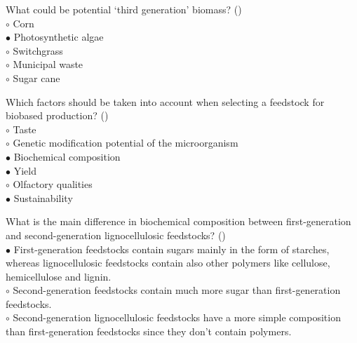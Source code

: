 \documentclass[]{beamer}
\begin{document}
\begin{CJK}{UTF8}{gbsn}
\begin{frame}[shrink] {} 
\addtocounter{answers}{1}
\color{blue}
  What could be potential ‘third generation’ biomass?
 ({})\\
\color{black}
\setlength{\parindent}{-0.4cm}
{\color{red}$\circ$} Corn  \\
{\color{red}$\bullet$} Photosynthetic algae  \\
{\color{red}$\circ$} Switchgrass  \\
{\color{red}$\circ$} Municipal waste  \\
{\color{red}$\circ$} Sugar cane  \\
\end{frame}


\begin{frame}[shrink] {} 
\addtocounter{answers}{1}
\color{blue}
  Which factors should be taken into account when selecting a feedstock for biobased production?
 ({})\\
\color{black}
\setlength{\parindent}{-0.4cm}
{\color{red}$\circ$} Taste  \\
{\color{red}$\circ$} Genetic modification potential of the microorganism  \\
{\color{red}$\bullet$} Biochemical composition  \\
{\color{red}$\bullet$} Yield  \\
{\color{red}$\circ$} Olfactory qualities  \\
{\color{red}$\bullet$} Sustainability  \\
\end{frame}


\begin{frame}[shrink] {} 
\addtocounter{answers}{1}
\color{blue}
  What is the main difference in biochemical composition between first-generation and second-generation lignocellulosic feedstocks? 
 ({})\\
\color{black}
\setlength{\parindent}{-0.4cm}
{\color{red}$\bullet$} First-generation feedstocks contain sugars mainly in the form of starches, whereas lignocellulosic feedstocks contain also other polymers like cellulose, hemicellulose and lignin.   \\
{\color{red}$\circ$} Second-generation feedstocks contain much more sugar than first-generation feedstocks.   \\
{\color{red}$\circ$} Second-generation lignocellulosic feedstocks have a more simple composition than first-generation feedstocks since they don't contain polymers.   \\
\end{frame}



\end{CJK}
\end{document}
